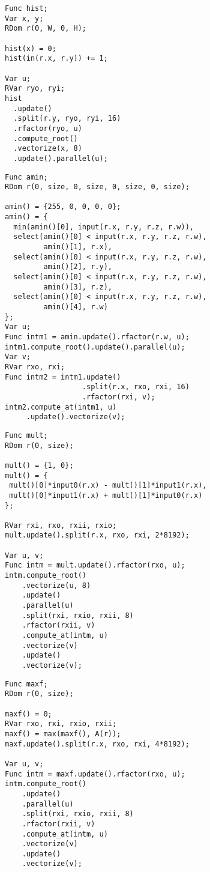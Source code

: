 \begin{lstlisting}[caption={Benchmark code for histogram of a two-dimensional image.}, label={lst:benchmark_histogram}]
Func hist;
Var x, y;
RDom r(0, W, 0, H);

hist(x) = 0;
hist(in(r.x, r.y)) += 1;

Var u;
RVar ryo, ryi;
hist
  .update()
  .split(r.y, ryo, ryi, 16)
  .rfactor(ryo, u)
  .compute_root()
  .vectorize(x, 8)
  .update().parallel(u);
\end{lstlisting}

\begin{lstlisting}[caption={Benchmark code for argmin over 4D array}, label={lst:benchmark_argmin}]
Func amin;
RDom r(0, size, 0, size, 0, size, 0, size);

amin() = {255, 0, 0, 0, 0};
amin() = {
  min(amin()[0], input(r.x, r.y, r.z, r.w)),
  select(amin()[0] < input(r.x, r.y, r.z, r.w), 
         amin()[1], r.x),
  select(amin()[0] < input(r.x, r.y, r.z, r.w), 
         amin()[2], r.y),
  select(amin()[0] < input(r.x, r.y, r.z, r.w), 
         amin()[3], r.z),
  select(amin()[0] < input(r.x, r.y, r.z, r.w), 
         amin()[4], r.w)
};
Var u;
Func intm1 = amin.update().rfactor(r.w, u);
intm1.compute_root().update().parallel(u);
Var v;
RVar rxo, rxi;
Func intm2 = intm1.update()
                  .split(r.x, rxo, rxi, 16)
                  .rfactor(rxi, v);
intm2.compute_at(intm1, u)
     .update().vectorize(v);                   
\end{lstlisting}

\begin{lstlisting}[caption={Benchmark code for complex product}, label={lst:benchmark_complex_multiply}]
Func mult;
RDom r(0, size);

mult() = {1, 0};
mult() = {
 mult()[0]*input0(r.x) - mult()[1]*input1(r.x),
 mult()[0]*input1(r.x) + mult()[1]*input0(r.x)
};

RVar rxi, rxo, rxii, rxio;
mult.update().split(r.x, rxo, rxi, 2*8192);

Var u, v;
Func intm = mult.update().rfactor(rxo, u);
intm.compute_root()
    .vectorize(u, 8)
    .update()
    .parallel(u)
    .split(rxi, rxio, rxii, 8)
    .rfactor(rxii, v)
    .compute_at(intm, u)
    .vectorize(v)
    .update()
    .vectorize(v);
\end{lstlisting}

\begin{lstlisting}[caption={Benchmark code for finding the maximum value over 1D array}, label={lst:benchmark_max}]
Func maxf;
RDom r(0, size);

maxf() = 0;
RVar rxo, rxi, rxio, rxii;
maxf() = max(maxf(), A(r));
maxf.update().split(r.x, rxo, rxi, 4*8192);

Var u, v;
Func intm = maxf.update().rfactor(rxo, u);
intm.compute_root()
    .update()
    .parallel(u)
    .split(rxi, rxio, rxii, 8)
    .rfactor(rxii, v)
    .compute_at(intm, u)
    .vectorize(v)
    .update()
    .vectorize(v);
\end{lstlisting}

